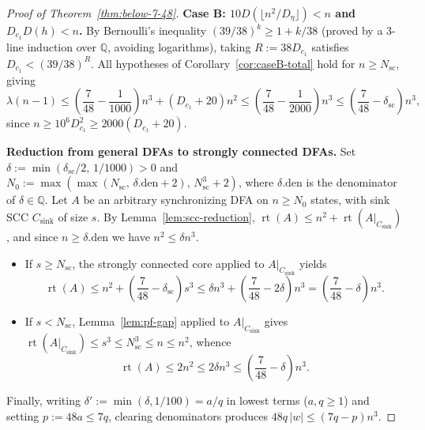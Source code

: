 \documentclass[11pt]{article}
\theoremstyle{definition}
\theoremstyle{remark}
\newcommand{\rt}{\operatorname{rt}}
\newcommand{\Q}{\mathbb{Q}}
\begin{document}
\begin{proof}[Proof of Theorem~\ref{thm:below-7-48}]
\smallskip
\noindent\textbf{Case B: $10 D(\lfloor n^2 / D_\eta \rfloor) < n$ and $D_{c_1} D(h) < n$.}
By Bernoulli's inequality $(39/38)^k \ge 1 + k / 38$ (proved by a 3-line induction over $\Q$, avoiding logarithms), taking $R := 38 D_{c_1}$ satisfies $D_{c_1} < (39/38)^R$. All hypotheses of Corollary~\ref{cor:caseB-total} hold for $n \ge N_{\mathrm{sc}}$, giving
\[
  \lambda(n - 1) \le \left(\frac{7}{48} - \frac{1}{1000}\right) n^3 + (D_{c_1} + 20) n^2
  \le \left(\frac{7}{48} - \frac{1}{2000}\right) n^3
  \le \left(\frac{7}{48} - \delta_{\mathrm{sc}}\right) n^3,
\]
since $n \ge 10^6 D_{c_1}^2 \ge 2000(D_{c_1} + 20)$.

\smallskip
\noindent\textbf{Reduction from general DFAs to strongly connected DFAs.}
Set $\delta := \min(\delta_{\mathrm{sc}} / 2,\, 1 / 1000) > 0$ and $N_0 := \max(\max(N_{\mathrm{sc}},\, \delta.\mathrm{den} + 2),\, N_{\mathrm{sc}}^3 + 2)$, where $\delta.\mathrm{den}$ is the denominator of $\delta \in \Q$. Let $A$ be an arbitrary synchronizing DFA on $n \ge N_0$ states, with sink SCC $C_{\mathrm{sink}}$ of size $s$. By Lemma~\ref{lem:scc-reduction}, $\rt(A) \le n^2 + \rt(A|_{C_{\mathrm{sink}}})$, and since $n \ge \delta.\mathrm{den}$ we have $n^2 \le \delta n^3$.
\begin{itemize}[leftmargin=2em]
  \item If $s \ge N_{\mathrm{sc}}$, the strongly connected core applied to $A|_{C_{\mathrm{sink}}}$ yields
  \[
    \rt(A) \le n^2 + \left(\frac{7}{48} - \delta_{\mathrm{sc}}\right) s^3
    \le \delta n^3 + \left(\frac{7}{48} - 2\delta\right) n^3
    = \left(\frac{7}{48} - \delta\right) n^3.
  \]
  \item If $s < N_{\mathrm{sc}}$, Lemma~\ref{lem:pf-gap} applied to $A|_{C_{\mathrm{sink}}}$ gives $\rt(A|_{C_{\mathrm{sink}}}) \le s^3 \le N_{\mathrm{sc}}^3 \le n \le n^2$, whence
  \[
    \rt(A) \le 2 n^2 \le 2\delta n^3 \le \left(\frac{7}{48} - \delta\right) n^3.
  \]
\end{itemize}
Finally, writing $\delta' := \min(\delta, 1/100) = a / q$ in lowest terms ($a, q \ge 1$) and setting $p := 48 a \le 7 q$, clearing denominators produces $48 q \, |w| \le (7 q - p) n^3$.
\end{proof}
\end{document}
